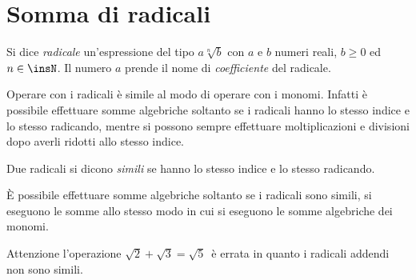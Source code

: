 \section{Somma di radicali}
\label{sec:radicali_somma}

Si dice \emph{radicale} un'espressione del tipo \(a\sqrt[n]b\) con \(a\) e \(b\) 
numeri reali, \(b{\geq}0\) ed \(n\in \insN\). Il numero \(a\) prende il nome di 
\emph{coefficiente} del radicale.

Operare con i radicali è simile al modo di operare con i monomi. Infatti è 
possibile effettuare somme algebriche soltanto se i radicali hanno lo 
stesso 
indice e lo stesso radicando, mentre si possono sempre effettuare 
moltiplicazioni e divisioni dopo averli ridotti allo stesso indice.
\begin{definizione}
 Due radicali si dicono \emph{simili} se hanno lo stesso indice e lo stesso 
 radicando.
\end{definizione}

È possibile effettuare somme algebriche soltanto se i radicali sono simili, 
si eseguono le somme allo stesso modo in cui si eseguono le somme 
algebriche 
dei monomi.

Attenzione l'operazione \(\sqrt{2}+\sqrt{3}=\sqrt 5\)\, è errata in quanto i 
radicali addendi non sono simili.

\newpage %

